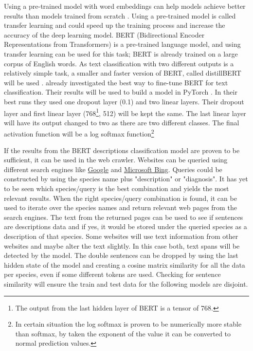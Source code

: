 \documentclass{article}
\begin{document}
Using a pre-trained model with word embeddings can help models achieve better results than models trained from scratch \autocite{mikolov_distributed_2013}.
Using a pre-trained model is called transfer learning and could speed up the training process and increase the accuracy of the deep learning model.
BERT (Bidirectional Encoder Representations from Transformers) \autocite{devlin_bert_2019} is a pre-trained language model, and using transfer learning can be used for this task; BERT is already trained on a large corpus of English words.
As text classification with two different outputs is a relatively simple task, a smaller and faster version of BERT, called distillBERT will be used \autocite{sanh_distilbert_2020}.
\textcite{sun_how_2020} already investigated the best way to fine-tune BERT for text classification. 
Their results will be used to build a model in PyTorch \autocite{paszke_pytorch_2019}.
In their best runs they used one dropout layer (0.1) and two linear layers. 
Their dropout layer and first linear layer (768\footnote{The output from the last hidden layer of BERT is a tensor of 768.}, 512) will be kept the same.
The last linear layer will have its output changed to two as there are two different classes.
The final activation function will be a log softmax function\footnote{In certain situation the log softmax is proven to be numerically more stable than softmax, by taken the exponent of the value it can be converted to normal prediction values.}

If the results from the BERT descriptions classification model are proven to be sufficient, it can be used in the web crawler.
Websites can be queried using different search engines like \href{www.google.com}{Google} and \href{www.bing.com}{Microsoft Bing}.
Queries could be constructed by using the species name plus "description" or "diagnosis". 
It has yet to be seen which species/query is the best combination and yields the most relevant results.
When the right species/query combination is found, it can be used to iterate over the species names and return relevant web pages from the search engines.
The text from the returned pages can be used to see if sentences are descriptions data and if yes, it would be stored under the queried species as a description of that species.
Some websites will use text information from other websites and maybe alter the text slightly. In this case both, text spans will be detected by the model. 
The double sentences can be dropped by using the last hidden state of the model and creating a cosine matrix similarity for all the data per species, even if some different tokens are used.
Checking for sentence similarity will ensure the train and test data for the following models are disjoint.
\end{document}
